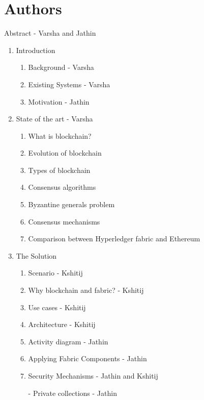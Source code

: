 \chapter{Authors}

Abstract - Varsha and Jathin
\begin{enumerate}
    \item Introduction
    \begin{enumerate} [label=1.\arabic*]
        \item Background - Varsha
        \item Existing Systems - Varsha
        \item Motivation - Jathin
    \end{enumerate}
    \item State of the art  - Varsha
    \begin{enumerate} [label=2.\arabic*]
        \item What is blockchain?
        \item Evolution of blockchain 
        \item Types of blockchain
        \item Consensus algorithms 
        \item Byzantine generals problem 
        \item Consensus mechanisms
        \item Comparison between Hyperledger fabric and Ethereum 
    \end{enumerate} 
    \item The Solution
    \begin{enumerate} [label=3.\arabic*]
        \item Scenario - Kshitij
        \item Why blockchain and fabric? - Kshitij
        \item Use cases - Kshitij
        \item Architecture - Kshitij
        \item Activity diagram - Jathin
        \item Applying Fabric Components - Jathin
        \item Security Mechanisms - Jathin and Kshitij
        
            - Private collections - Jathin 
            

\end{enumerate}
\end{enumerate}
